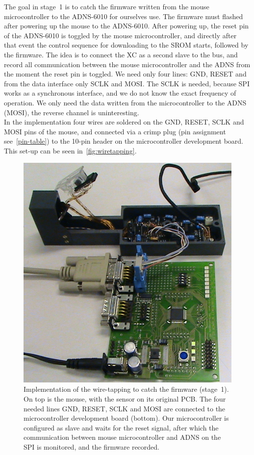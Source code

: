 \documentclass[12pt,a4paper]{article}
\begin{document}
The goal in stage~1 is to catch the firmware written from the mouse microcontroller to the ADNS-6010 for ourselves use.
The firmware must flashed after powering up the mouse to the ADNS-6010.
After powering up, the reset pin of the ADNS-6010 is toggled by the mouse microcontroller, and directly after that event the control sequence for downloading to the SROM starts, followed by the firmware.
The idea is to connect the XC as a second slave to the bus, and record all communication between the mouse microcontroller and the ADNS from the moment the reset pin is toggled.
We need only four lines: GND, RESET and from the data interface only SCLK and MOSI. 
The SCLK is needed, because SPI works as a synchronous interface, and we do not know the exact frequency of operation.
We only need the data written from the microcontroller to the ADNS (MOSI), the reverse channel is uninteresting.\\
In the implementation four wires are soldered on the GND, RESET, SCLK and MOSI pins of the mouse, and connected via a crimp plug (pin assignment see~\autoref{pin-table}) to the 10-pin header on the microcontroller development board. 
This set-up can be seen in~\autoref{fig:wiretapping}.

\begin{figure}[htbp]
\begin{center}
\includegraphics[width=0.8\columnwidth]{figures/wiretapping.png}
\caption{\label{fig:wiretapping}
Implementation of the wire-tapping to catch the firmware (stage~1).
On top is the mouse, with the sensor on its original PCB.
The four needed lines GND, RESET, SCLK and MOSI are connected to the microcontroller development board (bottom).
Our microcontroller is configured as slave and waits for the reset signal, after which the communication between mouse microcontroller and ADNS on the SPI is monitored, and the firmware recorded.
}
\end{center}
\end{figure}
\end{document}
